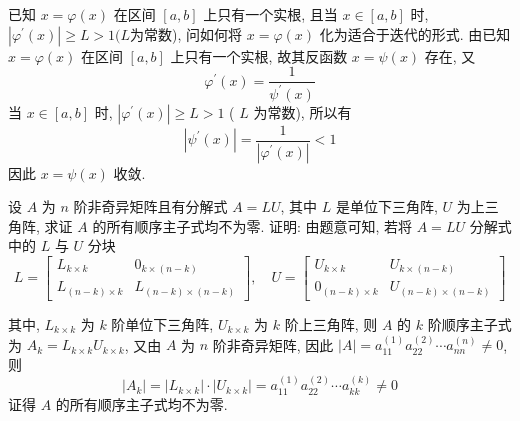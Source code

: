 \begin{tcolorbox}[enhanced,colback=8,colframe=7,breakable,coltitle=green!25!black,title=2024]
已知 $ x=\varphi(x) $ 在区间 $ [a, b] $ 上只有一个实根, 且当 $ x \in[a, b] $ 时, $ \left|\varphi^{\prime}(x)\right| \geqslant L>1(L $为常数), 问如何将 $ x=\varphi(x) $ 化为适合于迭代的形式.
\tcblower
由已知 $ x=\varphi(x) $ 在区间 $ [a, b] $ 上只有一个实根, 故其反函数 $ x=\psi(x) $ 存在, 又
$$
\varphi^{\prime}(x)=\frac{1}{\psi^{\prime}(x)}
$$
当 $ x \in[a, b] $ 时, $ \left|\varphi^{\prime}(x)\right| \geqslant L>1 $ ( $ L $ 为常数), 所以有
$$
\left|\psi^{\prime}(x)\right|=\frac{1}{\left|\varphi^{\prime}(x)\right|}<1
$$
因此 $ x=\psi(x) $ 收敛.
\end{tcolorbox}

  \begin{tcolorbox}[enhanced,colback=10,colframe=9,breakable,coltitle=green!25!black,title=2024]

 设 $ A $ 为 $ n $ 阶非奇异矩阵且有分解式 $ A=L U $, 其中 $ L $ 是单位下三角阵, $ U $ 为上三角阵, 求证 $ A $ 的所有顺序主子式均不为零.
 \tcblower
证明: 由题意可知, 若将 $ A=L U $ 分解式中的 $ L $ 与 $ U $ 分块
$$
L=\left[\begin{array}{cc}
L_{k \times k} & 0_{k \times(n-k)} \\
L_{(n-k) \times k} & L_{(n-k) \times(n-k)}
\end{array}\right], \quad U=\left[\begin{array}{cc}
U_{k \times k} & U_{k \times(n-k)} \\
0_{(n-k) \times k} & U_{(n-k) \times(n-k)}
\end{array}\right]
$$

其中, $ L_{k \times k} $ 为 $ k $ 阶单位下三角阵, $ U_{k \times k} $ 为 $ k $ 阶上三角阵, 则 $ A $ 的 $ k $ 阶顺序主子式为 $ A_{k}=L_{k \times k} U_{k \times k} $, 又由 $ A $ 为 $ n $ 阶非奇异矩阵, 因此 $ |A|=a_{11}^{(1)} a_{22}^{(2)} \cdots a_{n n}^{(n)} \neq 0 $,则
$$
\left|A_{k}\right|=\left|L_{k \times k}\right| \cdot\left|U_{k \times k}\right|=a_{11}^{(1)} a_{22}^{(2)} \cdots a_{k k}^{(k)} \neq 0
$$
证得 $ A $ 的所有顺序主子式均不为零.

 \end{tcolorbox}


